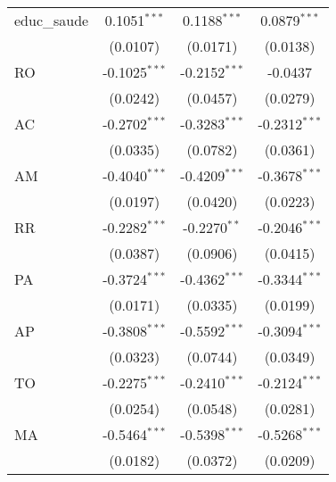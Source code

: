 \begin{tabular}{lccc}
   educ\_saude                     & 0.1051$^{***}$               & 0.1188$^{***}$         & 0.0879$^{***}$\\   
                                   & (0.0107)                     & (0.0171)               & (0.0138)\\   
   RO                              & -0.1025$^{***}$              & -0.2152$^{***}$        & -0.0437\\   
                                   & (0.0242)                     & (0.0457)               & (0.0279)\\   
   AC                              & -0.2702$^{***}$              & -0.3283$^{***}$        & -0.2312$^{***}$\\   
                                   & (0.0335)                     & (0.0782)               & (0.0361)\\   
   AM                              & -0.4040$^{***}$              & -0.4209$^{***}$        & -0.3678$^{***}$\\   
                                   & (0.0197)                     & (0.0420)               & (0.0223)\\   
   RR                              & -0.2282$^{***}$              & -0.2270$^{**}$         & -0.2046$^{***}$\\   
                                   & (0.0387)                     & (0.0906)               & (0.0415)\\   
   PA                              & -0.3724$^{***}$              & -0.4362$^{***}$        & -0.3344$^{***}$\\   
                                   & (0.0171)                     & (0.0335)               & (0.0199)\\   
   AP                              & -0.3808$^{***}$              & -0.5592$^{***}$        & -0.3094$^{***}$\\   
                                   & (0.0323)                     & (0.0744)               & (0.0349)\\   
   TO                              & -0.2275$^{***}$              & -0.2410$^{***}$        & -0.2124$^{***}$\\   
                                   & (0.0254)                     & (0.0548)               & (0.0281)\\   
   MA                              & -0.5464$^{***}$              & -0.5398$^{***}$        & -0.5268$^{***}$\\   
                                   & (0.0182)                     & (0.0372)               & (0.0209)\\   

\end{tabular}
